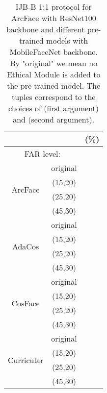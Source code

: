 \documentclass[nohyperref]{article}
\theoremstyle{plain}
\theoremstyle{definition}
\theoremstyle{remark}
\begin{document}
\begin{table}
\centering
\caption{IJB-B 1:1 protocol for ArcFace with ResNet100 backbone and different pre-trained models with MobileFaceNet backbone. By "original" we mean no Ethical Module is added to the pre-trained model. The tuples correspond to the choices of  (first argument) and  (second argument).}
\begin{tabular}{ c | c | c | c}

 & & \multicolumn{2}{c}{ (\%)} \\ \hline \hline
 \multicolumn{2}{c}{ FAR level: }         &  &  \\  
 \hline \hline
                              & original  &  &   \\
  \multirow{2}{*}{ArcFace}    & (15,20) &  &   \\
                              & (25,20) &  &   \\
                              & (45,30) &  &   \\ \hline   \hline   
                              & original  & &   \\
  \multirow{2}{*}{AdaCos}     & (15,20) & &   \\
                              & (25,20) & &   \\
                              & (45,30) & &   \\ \hline 
                              & original  & &   \\
\multirow{2}{*}{CosFace}      & (15,20) & &   \\
                              & (25,20) & &   \\
                              & (45,30) & &   \\ \hline 
                              & original  & &   \\
  \multirow{2}{*}{Curricular} & (15,20) & &   \\
                              & (25,20) & &   \\
                              & (45,30) & &   \\ \hline 
\end{tabular}
\label{tab:table9}
\end{table} 
\end{document}
